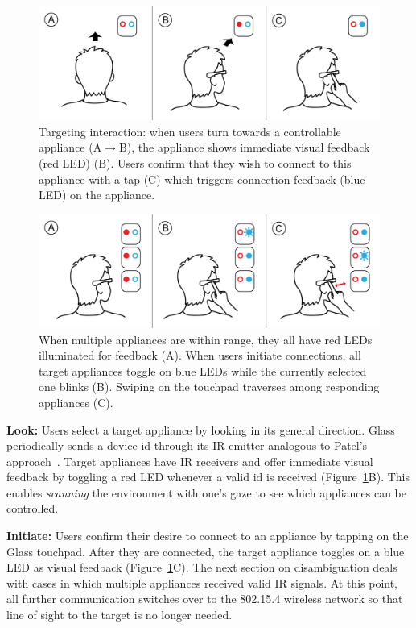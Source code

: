 \begin{figure}[t!]
\centering
\includegraphics[width=\columnwidth]{figures/stepbystep_small.png}
\caption{Targeting interaction: when users turn towards a controllable appliance (A$\rightarrow$B), the appliance shows immediate visual feedback (red LED) (B). Users confirm that they wish to connect to this appliance with a tap (C) which triggers connection feedback (blue LED) on the appliance.}
\label{fig:interaction}
\end{figure}

\begin{figure}[t!]
\centering
\includegraphics[width=\columnwidth]{figures/stepbystep_multi_small.png}
\caption{When multiple appliances are within range, they all have red LEDs illuminated for feedback (A). When users initiate connections, all target appliances toggle on blue LEDs while the currently selected one blinks (B). Swiping on the touchpad traverses among responding appliances (C).}
\label{fig:interaction_multi}
\end{figure}

{\bf Look:} Users select a target appliance by looking in its general direction.
Glass periodically sends a device id through its IR emitter analogous to Patel's approach~\cite{patel_2-way_2003}. Target appliances have IR receivers and offer immediate visual feedback by toggling a red LED whenever a valid id is received (Figure~\ref{fig:interaction}B). This enables {\em scanning} the environment with one's gaze to see which appliances can be controlled.

{\bf Initiate:} Users confirm their desire to connect to an appliance by tapping on the Glass touchpad. After they are connected, the target appliance toggles on a blue LED as visual feedback (Figure~\ref{fig:interaction}C). The next section on disambiguation deals with cases in which multiple appliances received valid IR signals. At this point, all further communication switches over to the 802.15.4 wireless network so that line of sight to the target is no longer needed.

